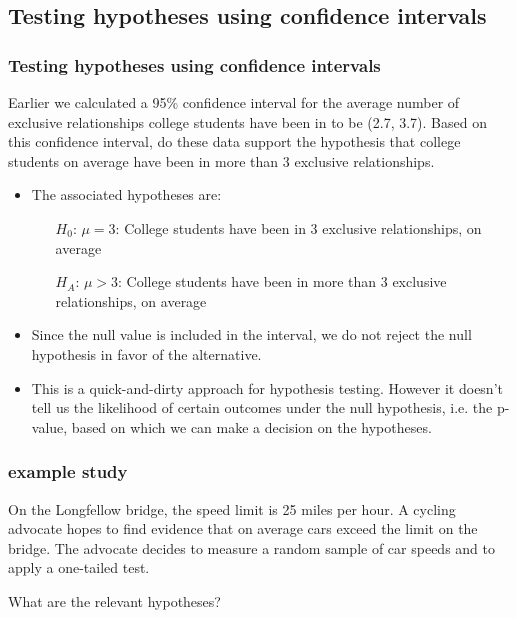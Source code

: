 
\subsection{Testing hypotheses using confidence intervals} 


\begin{frame}
\frametitle{Testing hypotheses using confidence intervals}
\vspace{-10pt}
{\small Earlier we calculated a 95\% confidence interval for the average number of exclusive relationships college students have been in to be (2.7, 3.7). Based on this confidence interval, do these data support the hypothesis that college students on average have been in more than 3 exclusive relationships.}

\pause

\begin{itemize}

\item The associated hypotheses are:
\begin{itemize}
\item[$H_0$:] $\mu = 3$: College students have been in 3 exclusive relationships, on average
\item[$H_A$:] $\mu > 3$: College students have been in more than 3 exclusive relationships, on average
\end{itemize}

\pause

\item Since the null value is included in the interval, we do not reject the null hypothesis in favor of the alternative.

\pause

\item This is a quick-and-dirty approach for hypothesis testing. However it doesn't tell us the likelihood of certain outcomes under the null hypothesis, i.e. the p-value, based on which we can make a decision on the hypotheses.

\end{itemize}

\end{frame}



\begin{frame}
\frametitle{example study}
On the Longfellow bridge, the speed limit is 25 miles per hour. A cycling advocate hopes to find evidence that on average cars exceed the limit on the bridge. The advocate decides to measure a random sample of car speeds and to apply a one-tailed test.\pause

What are the relevant hypotheses? \pause

 \pause 

\end{frame}

